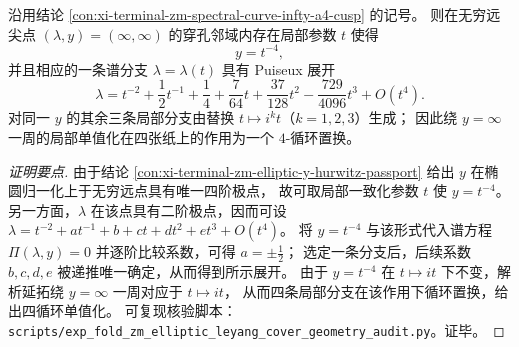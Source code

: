 \begin{theorem}\label{thm:xi-terminal-zm-puiseux-infty-4cycle}
沿用结论 \ref{con:xi-terminal-zm-spectral-curve-infty-a4-cusp} 的记号。
则在无穷远尖点 \((\lambda,y)=(\infty,\infty)\) 的穿孔邻域内存在局部参数 \(t\) 使得
\[
y=t^{-4},
\]
并且相应的一条谱分支 \(\lambda=\lambda(t)\) 具有 Puiseux 展开
\[
\lambda
=t^{-2}+\frac12 t^{-1}+\frac14+\frac{7}{64}t+\frac{37}{128}t^{2}-\frac{729}{4096}t^{3}+O(t^{4}).
\]
对同一 \(y\) 的其余三条局部分支由替换 \(t\mapsto i^{k}t\)（\(k=1,2,3\)）生成；
因此绕 \(y=\infty\) 一周的局部单值化在四张纸上的作用为一个 \(4\)-循环置换。
\end{theorem}
\begin{proof}[证明要点]
由于结论 \ref{con:xi-terminal-zm-elliptic-y-hurwitz-passport} 给出 \(y\) 在椭圆归一化上于无穷远点具有唯一四阶极点，
故可取局部一致化参数 \(t\) 使 \(y=t^{-4}\)。
另一方面，\(\lambda\) 在该点具有二阶极点，因而可设
\(
\lambda=t^{-2}+a t^{-1}+b+c t+d t^{2}+e t^{3}+O(t^{4})
\)。
将 \(y=t^{-4}\) 与该形式代入谱方程 \(\Pi(\lambda,y)=0\) 并逐阶比较系数，可得 \(a=\pm\frac12\)；
选定一条分支后，后续系数 \(b,c,d,e\) 被递推唯一确定，从而得到所示展开。
由于 \(y=t^{-4}\) 在 \(t\mapsto i t\) 下不变，解析延拓绕 \(y=\infty\) 一周对应于 \(t\mapsto i t\)，
从而四条局部分支在该作用下循环置换，给出四循环单值化。
可复现核验脚本：\texttt{scripts/exp\_fold\_zm\_elliptic\_leyang\_cover\_geometry\_audit.py}。证毕。
\end{proof}
